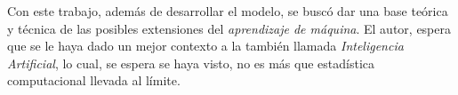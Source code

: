 \documentclass[../Main/Main.tex]{subfiles}
\begin{document}
Con este trabajo, además de desarrollar el modelo, se buscó dar una base teórica y técnica de las posibles extensiones del \textit{aprendizaje de máquina}. El autor, espera que se le haya dado un mejor contexto a la también llamada \textit{Inteligencia Artificial}, lo cual, se espera se haya visto, no es más que estadística computacional llevada al límite.
\end{document}
